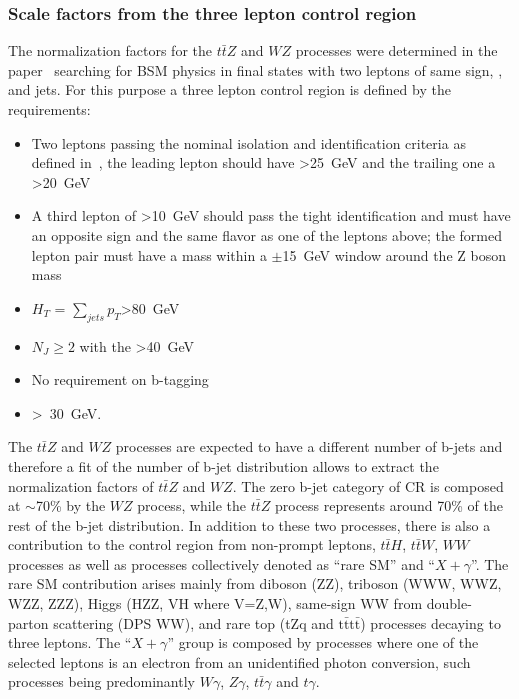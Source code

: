 
\subsubsection{Scale factors from the three lepton control region}

The normalization factors for the $t\bar{t}Z$ and  $WZ$ processes were determined in the  paper~\cite{Sirunyan:2017uyt} searching for BSM physics in final states with two leptons of same sign, \MET, and jets. For this purpose a three lepton control region is defined by the requirements:
\begin{itemize}
\item Two leptons passing the nominal isolation and identification criteria as defined in~\cite{Sirunyan:2017uyt}, the leading lepton should have \pt>25~GeV and the trailing one a \pt>20~GeV
\item A third lepton of \pt>10~GeV should pass the tight identification and must have an opposite sign and the same flavor as one of the leptons above; the formed lepton pair must have a mass within a $\pm$15~GeV window around the Z boson mass
\item $H_{T}$ = $\displaystyle\sum_{jets} p_{T}$>80~GeV
\item $N_{J} \geq 2$ with the \pt>40~GeV
\item No requirement on b-tagging
\item \MET>~30~GeV.
\end{itemize}

The $t\bar{t}Z$ and  $WZ$ processes are expected to have a different number of b-jets and  therefore a fit of the number of b-jet distribution allows to extract the normalization factors of $t\bar{t}Z$ and $WZ$. The zero b-jet category of CR is composed at $\sim$70\% by the $WZ$ process, while the $t\bar{t}Z$ process represents around 70\% of the rest of the b-jet distribution. In addition to these two processes, there is also a contribution to the control region from non-prompt leptons, $t\bar{t}H$,  $t\bar{t}W$, $WW$ processes as well as processes collectively denoted as ``rare SM'' and ``$X+\gamma$''. The rare SM contribution arises mainly from diboson (ZZ), triboson (WWW, WWZ, WZZ, ZZZ), Higgs (HZZ, VH where V=Z,W), same-sign WW from double-parton scattering (DPS WW), and rare top (tZq and $\mathrm{t\bar{t}t\bar{t}}$) processes decaying to three leptons. The ``$X+\gamma$'' group is composed by processes where one of the selected leptons is an electron from an unidentified photon conversion, such processes being predominantly $W\gamma$, $Z\gamma$, $t\bar{t}\gamma$ and $t\gamma$.


